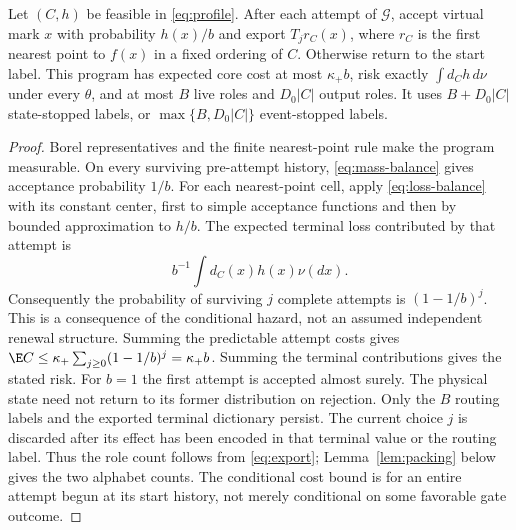\begin{lemma}\label{lem:upper}
Let $(C,h)$ be feasible in \eqref{eq:profile}. After each attempt of $\mathcal G$, accept virtual mark $x$ with probability $h(x)/b$ and export $T_jr_C(x)$, where $r_C$ is the first nearest point to $f(x)$ in a fixed ordering of $C$. Otherwise return to the start label. This program has expected core cost at most $\kappa_+ b$, risk exactly $\int d_C h\,d\nu$ under every $\theta$, and at most $B$ live roles and $D_0|C|$ output roles. It uses $B+D_0|C|$ state-stopped labels, or $\max\{B,D_0|C|\}$ event-stopped labels.
\end{lemma}
\begin{proof}
Borel representatives and the finite nearest-point rule make the program measurable. On every surviving pre-attempt history, \eqref{eq:mass-balance} gives acceptance probability $1/b$. For each nearest-point cell, apply \eqref{eq:loss-balance} with its constant center, first to simple acceptance functions and then by bounded approximation to $h/b$. The expected terminal loss contributed by that attempt is
\[
 b^{-1}\int d_C(x)h(x)\nu(dx).
\]
Consequently the probability of surviving $j$ complete attempts is $(1-1/b)^j$. This is a consequence of the conditional hazard, not an assumed independent renewal structure. Summing the predictable attempt costs gives $\E C\le\kappa_+\sum_{j\ge0}(1-1/b)^j=\kappa_+ b$. Summing the terminal contributions gives the stated risk. For $b=1$ the first attempt is accepted almost surely. The physical state need not return to its former distribution on rejection. Only the $B$ routing labels and the exported terminal dictionary persist. The current choice $j$ is discarded after its effect has been encoded in that terminal value or the routing label. Thus the role count follows from \eqref{eq:export}; Lemma~\ref{lem:packing} below gives the two alphabet counts. The conditional cost bound is for an entire attempt begun at its start history, not merely conditional on some favorable gate outcome.
\end{proof}

